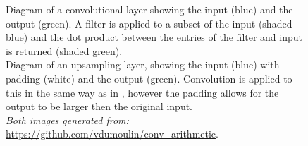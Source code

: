\documentclass[11pt,a4paper,onecolumn]{report}
\begin{document}
\begin{figure}%
  \centering
  \qquad
  \caption[ Diagram of a convolutional layer  Diagram of an upsampling layer]{ Diagram of a convolutional layer showing the input (blue) and the output (green). A filter is applied to a subset of the input (shaded blue) and the dot product between the entries of the filter and input is returned (shaded green). \\
   Diagram of an upsampling layer, showing the input (blue) with padding (white) and the output (green). Convolution is applied to this in the same way as in , however the padding allows for the output to be larger then the original input.\\
  \textit{Both images generated from:} \url{https://github.com/vdumoulin/conv_arithmetic}.}
  \end{figure}

%
\end{document}
